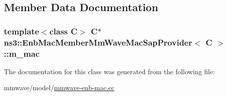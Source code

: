 \subsection{Member Data Documentation}
\subsubsection[{\texorpdfstring{m\+\_\+mac}{m_mac}}]{\setlength{\rightskip}{0pt plus 5cm}template$<$class C$>$ {\bf C}$\ast$ {\bf ns3\+::\+Enb\+Mac\+Member\+Mm\+Wave\+Mac\+Sap\+Provider}$<$ {\bf C} $>$\+::m\+\_\+mac\hspace{0.3cm}{\ttfamily [private]}}\hypertarget{classns3_1_1EnbMacMemberMmWaveMacSapProvider_a35f574b07a965a713da5bb15efdd74fa}{}\label{classns3_1_1EnbMacMemberMmWaveMacSapProvider_a35f574b07a965a713da5bb15efdd74fa}


The documentation for this class was generated from the following file\+:\begin{DoxyCompactItemize}
\item 
mmwave/model/\hyperlink{mmwave-enb-mac_8cc}{mmwave-\/enb-\/mac.\+cc}\end{DoxyCompactItemize}
